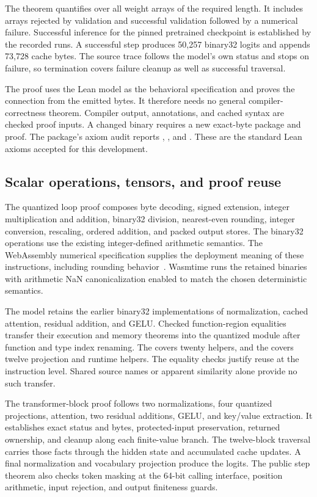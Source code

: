 The theorem quantifies over all weight arrays of the required length.  It includes arrays rejected by validation and successful validation followed by a numerical failure.  Successful inference for the pinned pretrained checkpoint is established by the recorded runs.  A successful step produces 50,257 binary32 logits and appends 73,728 cache bytes.  The source trace follows the model's own status and stops on failure, so termination covers failure cleanup as well as successful traversal.

The proof uses the Lean model as the behavioral specification and proves the connection from the emitted bytes.  It therefore needs no general compiler-correctness theorem.  Compiler output, annotations, and cached syntax are checked proof inputs.  A changed binary requires a new exact-byte package and proof.  The package's axiom audit reports , , and .  These are the standard Lean axioms accepted for this development.

\subsection{Scalar operations, tensors, and proof reuse}

The quantized loop proof composes byte decoding, signed extension, integer multiplication and addition, binary32 division, nearest-even rounding, integer conversion, rescaling, ordered addition, and packed output stores.  The binary32 operations use the existing integer-defined arithmetic semantics.  The WebAssembly numerical specification supplies the deployment meaning of these instructions, including rounding behavior~\cite{wasm}.  Wasmtime runs the retained binaries with arithmetic NaN canonicalization enabled to match the chosen deterministic semantics.

The model retains the earlier binary32 implementations of normalization, cached attention, residual addition, and GELU.  Checked function-region equalities transfer their execution and memory theorems into the quantized module after function and type index renaming.  The  covers twenty helpers, and the  covers twelve projection and runtime helpers.  The equality checks justify reuse at the instruction level.  Shared source names or apparent similarity alone provide no such transfer.

The transformer-block proof follows two normalizations, four quantized projections, attention, two residual additions, GELU, and key/value extraction.  It establishes exact status and bytes, protected-input preservation, returned ownership, and cleanup along each finite-value branch.  The twelve-block traversal carries those facts through the hidden state and accumulated cache updates.  A final normalization and vocabulary projection produce the logits.  The public step theorem also checks token masking at the 64-bit calling interface, position arithmetic, input rejection, and output finiteness guards.

